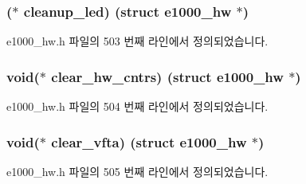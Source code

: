 \subsubsection[{\texorpdfstring{cleanup\+\_\+led}{cleanup_led}}]{($\ast$ cleanup\+\_\+led) (struct {\bf e1000\+\_\+hw} $\ast$)}\hypertarget{structe1000__mac__operations_aaded575d7f1bf7152eb3ea72cf2ae601}{}\label{structe1000__mac__operations_aaded575d7f1bf7152eb3ea72cf2ae601}


e1000\+\_\+hw.\+h 파일의 503 번째 라인에서 정의되었습니다.

\subsubsection[{\texorpdfstring{clear\+\_\+hw\+\_\+cntrs}{clear_hw_cntrs}}]{\setlength{\rightskip}{0pt plus 5cm}void($\ast$ clear\+\_\+hw\+\_\+cntrs) (struct {\bf e1000\+\_\+hw} $\ast$)}\hypertarget{structe1000__mac__operations_a687407cdf8743f5dab9f795eb868e7d8}{}\label{structe1000__mac__operations_a687407cdf8743f5dab9f795eb868e7d8}


e1000\+\_\+hw.\+h 파일의 504 번째 라인에서 정의되었습니다.

\subsubsection[{\texorpdfstring{clear\+\_\+vfta}{clear_vfta}}]{\setlength{\rightskip}{0pt plus 5cm}void($\ast$ clear\+\_\+vfta) (struct {\bf e1000\+\_\+hw} $\ast$)}\hypertarget{structe1000__mac__operations_ae387e054c349af2e0890f9853b8773f5}{}\label{structe1000__mac__operations_ae387e054c349af2e0890f9853b8773f5}


e1000\+\_\+hw.\+h 파일의 505 번째 라인에서 정의되었습니다.

